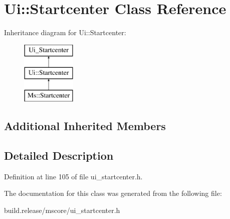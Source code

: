 \hypertarget{class_ui_1_1_startcenter}{}\section{Ui\+:\+:Startcenter Class Reference}
\label{class_ui_1_1_startcenter}
Inheritance diagram for Ui\+:\+:Startcenter\+:\begin{figure}[H]
\begin{center}
\leavevmode
\includegraphics[height=3.000000cm]{class_ui_1_1_startcenter}
\end{center}
\end{figure}
\subsection*{Additional Inherited Members}


\subsection{Detailed Description}


Definition at line 105 of file ui\+\_\+startcenter.\+h.



The documentation for this class was generated from the following file\+:\begin{DoxyCompactItemize}
\item 
build.\+release/mscore/ui\+\_\+startcenter.\+h\end{DoxyCompactItemize}

